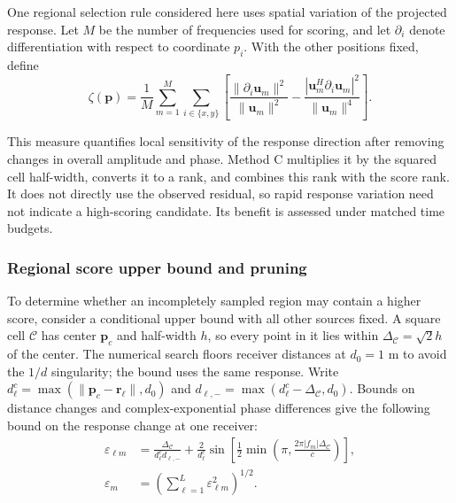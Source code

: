 \documentclass[11pt,a4paper]{article}
\numberwithin{equation}{section}
\numberwithin{figure}{section}
\numberwithin{table}{section}
\begin{document}
One regional selection rule considered here uses spatial variation of the projected response. Let $M$ be the number of frequencies used for scoring, and let $\partial_i$ denote differentiation with respect to coordinate $p_i$. With the other positions fixed, define
\begin{equation}\label{eq:2.19}
\zeta(\mathbf{p}) =\frac{1}{M}\sum_{m=1}^{M}\sum_{i\in\{x,y\}} \left[ \frac{\|\partial_i\mathbf{u}_m\|^2}{\|\mathbf{u}_m\|^2} - \frac{|\mathbf{u}_m^H\partial_i\mathbf{u}_m|^2}{\|\mathbf{u}_m\|^4} \right].
\end{equation}

This measure quantifies local sensitivity of the response direction after removing changes in overall amplitude and phase. Method C multiplies it by the squared cell half-width, converts it to a rank, and combines this rank with the score rank. It does not directly use the observed residual, so rapid response variation need not indicate a high-scoring candidate. Its benefit is assessed under matched time budgets.

\subsubsection{Regional score upper bound and pruning}\label{sec:region-bound}

To determine whether an incompletely sampled region may contain a higher score, consider a conditional upper bound with all other sources fixed. A square cell $\mathcal C$ has center $\mathbf p_c$ and half-width $h$, so every point in it lies within $\Delta_{\mathcal C}=\sqrt{2}h$ of the center. The numerical search floors receiver distances at $d_0=1$ m to avoid the $1/d$ singularity; the bound uses the same response. Write $d_\ell^c=\max(\|\mathbf p_c-\mathbf r_\ell\|,d_0)$ and $d_{\ell,-}=\max(d_\ell^c-\Delta_{\mathcal C},d_0)$. Bounds on distance changes and complex-exponential phase differences give the following bound on the response change at one receiver:
\begin{equation}\label{eq:response-bound}
\begin{aligned}
\varepsilon_{\ell m}
&=\frac{\Delta_{\mathcal C}}{d_\ell^c d_{\ell,-}}
+\frac{2}{d_\ell^c}\sin\!\left[\frac12\min\!\left(\pi,\frac{2\pi|f_m|\Delta_{\mathcal C}}{c}\right)\right],\\
\varepsilon_m&=\left(\sum_{\ell=1}^{L}\varepsilon_{\ell m}^2\right)^{1/2}.
\end{aligned}
\end{equation}
\end{document}
